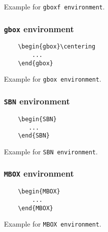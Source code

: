 \begin{gboxf}\centering
	Example for \verb|gboxf environment|.
\end{gboxf}

\subsubsection{\texttt{gbox} environment}
\begin{SBN}
    \begin{verbatim} 
    \begin{gbox}\centering
        ...
    \end{gbox}
    \end{verbatim}
\end{SBN}

\begin{gbox}\centering
    Example for \verb|gbox environment|.
\end{gbox}


\subsubsection{\texttt{SBN} environment}
\begin{SBN}
    \begin{verbatim}
    \begin{SBN}
       ...
    \end{SBN}
    \end{verbatim}
\end{SBN}

\begin{SBN}
    Example for \verb|SBN environment|.
\end{SBN}


\subsubsection{\texttt{MBOX} environment}

\begin{SBN}
    \begin{verbatim}
    \begin{MBOX}
    	...
    \end{MBOX}
    \end{verbatim}
\end{SBN}

\begin{MBOX}
	Example for \verb|MBOX environment|.
\end{MBOX}


